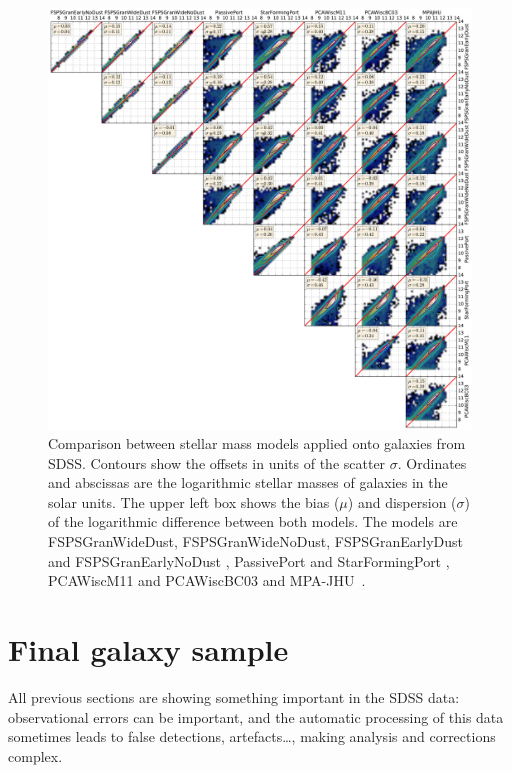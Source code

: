 \begin{figure}[htp]
    \centering
    \includegraphics[width=\linewidth]{figures/sdss/stellar_mass_models.pdf}
    \caption{Comparison between stellar mass models applied onto galaxies from
        SDSS\@. Contours show the offsets in units of the scatter $\sigma$.
        Ordinates and abscissas are the logarithmic stellar masses of galaxies
        in the solar units. The upper left box shows the bias ($\mu$) and
        dispersion ($\sigma$) of the logarithmic difference between both
        models. The models are FSPSGranWideDust, FSPSGranWideNoDust,
        FSPSGranEarlyDust and FSPSGranEarlyNoDust \citep{Conroy+09},
        PassivePort and StarFormingPort \citep{Maraston+09}, PCAWiscM11 and
    PCAWiscBC03 \citep{Chen+12} and MPA-JHU~\citep{Brinchmann+04, Kauffmann+03,
Tremonti+04}.\label{fig:stellar_mass_models}}
\end{figure}

\section{Final galaxy sample}
\label{sec:final_galaxy_sample}

All previous sections are showing something important in the SDSS data:
observational errors can be important, and the automatic processing of this
data sometimes leads to false detections, artefacts\ldots, making analysis and
corrections complex.

